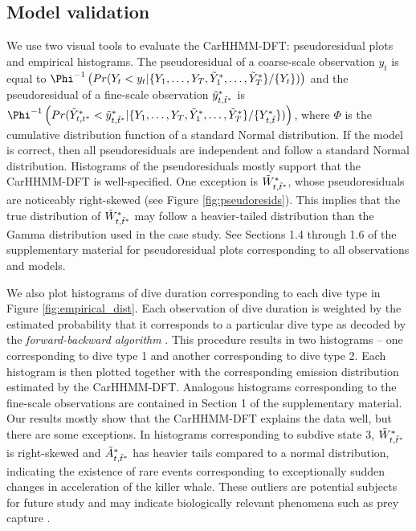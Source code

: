 \subsection{Model validation}
\label{subsec:model_validation}

We use two visual tools to evaluate the CarHHMM-DFT: pseudoresidual plots and empirical histograms. The pseudoresidual of a coarse-scale observation $y_t$ is equal to $\Phi^{-1} \left(Pr(Y_t < y_t|\{Y_1,\ldots,Y_T,\Z_1,\ldots,\Z_T\}/\{Y_t\}) \right)$ and the pseudoresidual of a fine-scale observation $\tilde{y}^*_{t,\tilde t^*}$ is $\Phi^{-1} \left(Pr(\Z_{t,t^*} < \z_{t,\tilde t^*}|\{Y_1,\ldots,Y_T,\Z_1,\ldots,\Z_T\}/\{Y^*_{t,\tilde t}\}) \right)$, where $\Phi$ is the cumulative distribution function of a standard Normal distribution. If the model is correct, then all pseudoresiduals are independent and follow a standard Normal distribution. Histograms of the pseudoresiduals mostly support that the CarHHMM-DFT is well-specified. One exception is $\tilde{W}^*_{t,\tilde t^*}$, whose pseudoresiduals are noticeably right-skewed (see Figure \ref{fig:pseudoresids}). This implies that the true distribution of $\tilde{W}^*_{t,\tilde t^*}$ may follow a heavier-tailed distribution than the Gamma distribution used in the case study. See Sections 1.4 through 1.6 of the supplementary material for pseudoresidual plots corresponding to all observations and models.

We also plot histograms of dive duration corresponding to each dive type in Figure \ref{fig:empirical_dist}. Each observation of dive duration is weighted by the estimated probability that it corresponds to a particular dive type as decoded by the \textit{forward-backward algorithm} \citep{Zucchini:2016}. This procedure results in two histograms -- one corresponding to dive type 1 and another corresponding to dive type 2. Each histogram is then plotted together with the corresponding emission distribution estimated by the CarHHMM-DFT. Analogous histograms corresponding to the fine-scale observations are contained in Section 1 of the supplementary material. Our results mostly show that the CarHHMM-DFT explains the data well, but there are some exceptions. In histograms corresponding to subdive state 3, $\tilde{W}^*_{t,\tilde t^*}$ is right-skewed and $\tilde{A}^*_{t,\tilde t^*}$ has heavier tails compared to a normal distribution, indicating the existence of rare events corresponding to exceptionally sudden changes in acceleration of the killer whale. These outliers are potential subjects for future study and may indicate biologically relevant phenomena such as prey capture \citep{Tennessen:2019a}.

